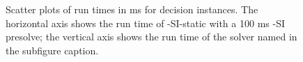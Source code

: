 \begin{figure}[htb]
{        \label{figure:TODO}
    }
    \caption{Scatter plots of run times in ms for decision instances.
            The horizontal axis shows the run time of \McSplit-SI-static
            with a 100 ms \McSplit-SI presolve; the vertical axis shows
            the run time of the solver named in the subfigure caption.}
    \label{figure:TODO}
\end{figure}

